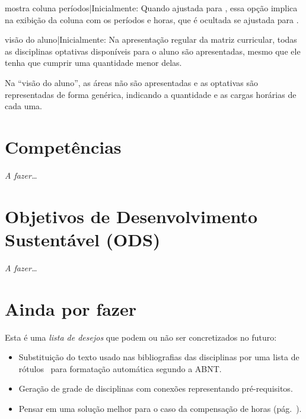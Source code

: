 \documentclass[a4paper, 11pt]{article}
\begin{document}
\begin{Optiondef}{mostra coluna períodos}{|}{Inicialmente: }
    Quando ajustada para , essa opção implica na exibição da coluna com os períodos e horas, que é ocultada se ajustada para .
\end{Optiondef}

\begin{Optiondef}{visão do aluno}{|}{Inicialmente: }
    Na apresentação regular da matriz curricular, todas as disciplinas optativas disponíveis para o aluno são apresentadas, mesmo que ele tenha que cumprir uma quantidade menor delas.

    Na ``visão do aluno'', as áreas não são apresentadas e as optativas são representadas de forma genérica, indicando a quantidade e as cargas horárias de cada uma.
\end{Optiondef}




\section{Competências}
\textit{A fazer\ldots}


\section{Objetivos de Desenvolvimento Sustentável (ODS)}
\textit{A fazer\ldots}


\section{Ainda por fazer}
Esta é uma \textit{lista de desejos} que podem ou não ser concretizados no futuro:

\begin{itemize}
    \item Substituição do texto usado nas bibliografias das disciplinas por uma lista de rótulos \BibTeX\ para formatação automática segundo a ABNT.
    \item Geração de grade de disciplinas com conexões representando pré-requisitos.
    \item Pensar em uma solução melhor para o caso da compensação de horas (pág.~\pageref{sec:compensacao-carga-horaria}).
\end{itemize}

\printindex
\end{document}
